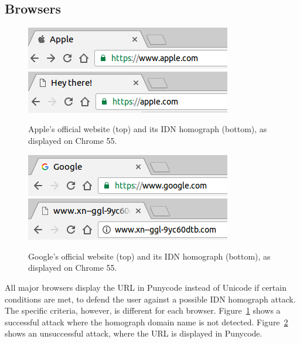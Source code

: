 \documentclass[letterpaper,twocolumn,10pt]{article}
\begin{document}
\subsection{Browsers}
\begin{figure}[t]
  \includegraphics[width=\linewidth]{images/apple}
  \includegraphics[width=\linewidth]{images/fakeapple-punycode}
  \centering
  \caption{Apple's official website (top) and its IDN homograph (bottom), as displayed on Chrome 55.}
  \label{screenshot-apple}
\end{figure}

\begin{figure}[t]
  \includegraphics[width=\linewidth]{images/google}
  \includegraphics[width=\linewidth]{images/fakegoogle-punycode}
  \centering
  \caption{Google's official website (top) and its IDN homograph (bottom), as displayed on Chrome 55.}
  \label{screenshot-google}
\end{figure}

All major browsers display the URL in Punycode instead of Unicode if certain conditions are met, to defend the user against a possible IDN homograph attack.
The specific criteria, however, is different for each browser.
Figure~\ref{screenshot-apple} shows a successful attack where the homograph domain name is not detected.
Figure~\ref{screenshot-google} shows an unsuccessful attack, where the URL is displayed in Punycode.
\end{document}
